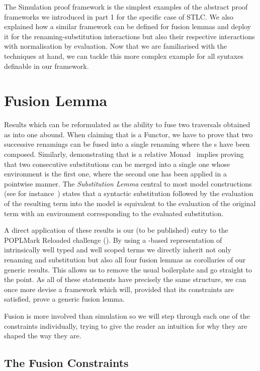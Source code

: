 The Simulation proof framework is the simplest examples of the abstract
proof frameworks we introduced in part 1 for the specific case of STLC.
We also explained how a similar framework can be defined
for fusion lemmas and deploy it for the renaming-substitution interactions
but also their respective interactions with normalisation by evaluation.
Now that we are familiarised with the techniques at hand, we can tackle
this more complex example for all syntaxes definable in our framework.

\section{Fusion Lemma}\label{section:fusion}

Results which can be reformulated as the ability to fuse two traversals
obtained as  into one abound. When claiming that  is
a Functor, we have to prove that two successive renamings can be fused into
a single renaming where the s have been composed. Similarly,
demonstrating that  is a relative Monad~\cite{JFR4389} implies proving
that two consecutive substitutions can be merged into a single one whose
environment is the first one, where the second one has been applied in a
pointwise manner. The \emph{Substitution Lemma} central
to most model constructions (see for instance~\cite{mitchell1991kripke}) states
that a syntactic substitution followed by the evaluation of the resulting term
into the model is equivalent to the evaluation of the original term with an
environment corresponding to the evaluated substitution.

A direct application of these results is our (to be published) entry to the
POPLMark Reloaded challenge (\citeyear{poplmarkreloaded}). By using a -based
representation of intrinsically well typed and well scoped terms we directly inherit
not only renaming and substitution but also all four fusion lemmas as corollaries
of our generic results. This allows us to remove the usual boilerplate
and go straight to the point.
As all of these statements have precisely the same structure, we can
once more devise a framework which will, provided that its constraints are
satisfied, prove a generic fusion lemma.

Fusion is more involved than simulation so we will step through
each one of the constraints individually, trying to give the reader an intuition
for why they are shaped the way they are.


\subsection{The Fusion Constraints}

